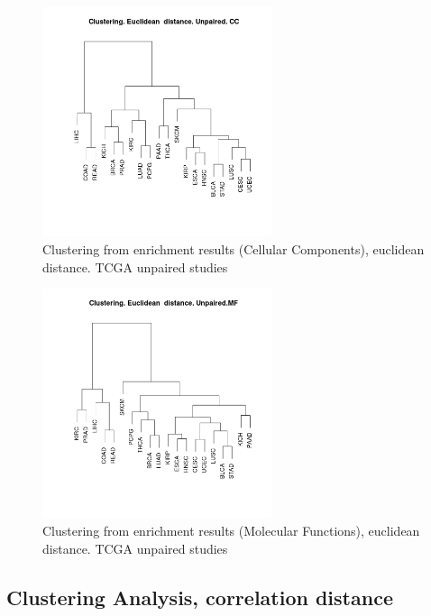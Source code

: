 \documentclass[a4paper,12pt]{article}
\begin{document}
\begin{figure}[!h] 
\centering 
\includegraphics[width=0.6\textwidth]{img/cluster_euclideand_cc_unpaired.png} 
\caption{Clustering from enrichment results (Cellular Components), euclidean distance.  TCGA unpaired studies} 
\label{figCLUST_eu_cc_unpaired} 
\end{figure} 

\begin{figure}[!h] 
\centering 
\includegraphics[width=0.6\textwidth]{img/cluster_euclideand_mf_unpaired.png} 
\caption{Clustering from enrichment results (Molecular Functions), euclidean distance.  TCGA unpaired studies} 
\label{figCLUST_eu_mf_unpaired} 
\end{figure} 
\clearpage


\subsection{Clustering Analysis, correlation distance}
\end{document}
